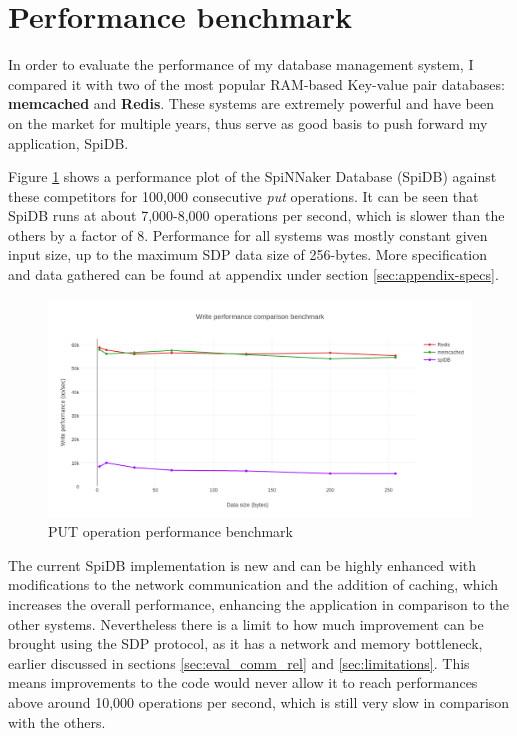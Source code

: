 

\section{Performance benchmark}
In order to evaluate the performance of my database management system, I compared it with two of the most popular RAM-based Key-value pair databases: \textbf{memcached}\cite{memcached} and \textbf{Redis}\cite{redis}. These systems are extremely powerful and have been on the market for multiple years, thus serve as good basis to push forward my application, SpiDB.

Figure \ref{fig:write-perf-benchmark} shows a performance plot of the SpiNNaker Database (SpiDB) against these competitors for 100,000 consecutive \textit{put} operations. It can be seen that SpiDB runs at about 7,000-8,000 operations per second, which is slower than the others by a factor of 8. Performance for all systems was mostly constant given input size, up to the maximum SDP data size of 256-bytes. More specification and data gathered can be found at appendix under section \ref{sec:appendix-specs}.

\begin{figure}
\begin{center}
	\includegraphics[width=1.4\textwidth, natwidth=1063, natheight=509]{images/write_performance.png}
\end{center}
\caption{PUT operation performance benchmark}
\label{fig:write-perf-benchmark}
\end{figure}

The current SpiDB implementation is new and can be highly enhanced with modifications to the network communication and the addition of caching, which increases the overall performance, enhancing the application in comparison to the other systems. Nevertheless there is a limit to how much improvement can be brought using the SDP protocol, as it has a network and memory bottleneck, earlier discussed in sections \ref{sec:eval_comm_rel} and \ref{sec:limitations}. This means improvements to the code would never allow it to reach performances above around 10,000 operations per second, which is still very slow in comparison with the others.

